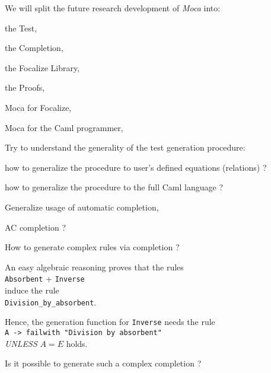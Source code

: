 

We will split the future research development of {\em Moca} into:

\begin{citemize}
  \item the Test,
  \item the Completion,
  \item the Focalize Library,
  \item the Proofs,
  \item Moca for Focalize,
  \item Moca for the Caml programmer,
\end{citemize}


Try to understand the generality of the test generation procedure:
\begin{citemize}
\item how to generalize the procedure to user's defined equations (relations) ?
\item how to generalize the procedure to the full Caml language ?
\end{citemize}


\begin{citemize}
\item Generalize usage of automatic completion,
\item AC completion ?
\item How to generate complex rules via completion ?
\end{citemize}


An easy algebraic reasoning proves that the rules \\
{\tt Absorbent} + {\tt Inverse} \\
induce the rule \\
{\tt Division\_by\_absorbent}.

Hence, the generation function for {\tt Inverse} needs the rule \\
      {\tt A -> failwith "Division by absorbent"} \\
      {\em UNLESS} $ A = E $ holds.

Is it possible to generate such a complex completion ?

